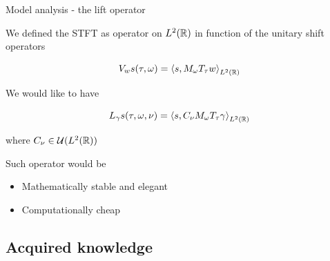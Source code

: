 \documentclass[10pt,american,ignorenonframetext,aspectratio=1610]{beamer}
\providecommand{\tightlist}{%
  \setlength{\itemsep}{0pt}\setlength{\parskip}{0pt}}
\theoremstyle{remark}
\begin{document}
\begin{frame}{Model analysis - the lift operator}
\protect\hypertarget{model-analysis---the-lift-operator}{}

We defined the STFT as operator on \(L^2(\mathbb{R})\) in function of the
unitary shift operators

\[V_w s(\tau,\omega) = \left\langle s, M_\omega T_\tau w\right\rangle_{L^2(\mathbb{R})}\]

We would like to have

\[L_\gamma s(\tau,\omega,\nu) = \left\langle s,C_\nu M_\omega T_\tau \gamma\right\rangle_{L^2(\mathbb{R})}\]

where \(C_\nu\in\mathcal{U}(L^2(\mathbb{R}))\)

Such operator would be

\begin{itemize}
\tightlist
\item
  Mathematically stable and elegant
\item
  Computationally cheap
\end{itemize}

\end{frame}

\hypertarget{acquired-knowledge}{%
\subsection{Acquired knowledge}\label{acquired-knowledge}}
\end{document}
